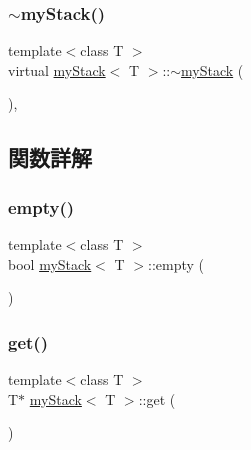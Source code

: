 \mbox{\label{classmy_stack_a75286e7b2439d03bce4d1c9883f8a81b}} 
\subsubsection{\texorpdfstring{$\sim$my\+Stack()}{~myStack()}}
{\footnotesize\ttfamily template$<$class T $>$ \\
virtual \hyperlink{classmy_stack}{my\+Stack}$<$ T $>$\+::$\sim$\hyperlink{classmy_stack}{my\+Stack} (\begin{DoxyParamCaption}{ }\end{DoxyParamCaption})\hspace{0.3cm}{\ttfamily [inline]}, {\ttfamily [virtual]}}



\subsection{関数詳解}
\mbox{\label{classmy_stack_a1f330f063efc09879b12d039ae195b3a}} 
\subsubsection{\texorpdfstring{empty()}{empty()}}
{\footnotesize\ttfamily template$<$class T $>$ \\
bool \hyperlink{classmy_stack}{my\+Stack}$<$ T $>$\+::empty (\begin{DoxyParamCaption}{ }\end{DoxyParamCaption})\hspace{0.3cm}{\ttfamily [inline]}}

\mbox{\label{classmy_stack_aabbc8ac3b85d2ecd1b1fab78c4abf3dc}} 
\subsubsection{\texorpdfstring{get()}{get()}}
{\footnotesize\ttfamily template$<$class T $>$ \\
T$\ast$ \hyperlink{classmy_stack}{my\+Stack}$<$ T $>$\+::get (\begin{DoxyParamCaption}{ }\end{DoxyParamCaption})\hspace{0.3cm}{\ttfamily [inline]}}

